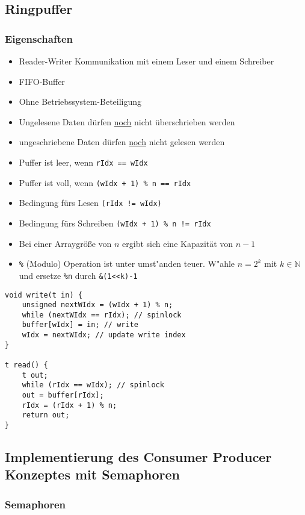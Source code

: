 \subsection{Ringpuffer}

\subsubsection{Eigenschaften}
\begin{itemize}
\item Reader-Writer Kommunikation mit einem Leser und einem Schreiber
\item FIFO-Buffer
\item Ohne Betriebssystem-Beteiligung
\item Ungelesene Daten dürfen \uline{noch} nicht überschrieben werden
\item ungeschriebene Daten dürfen \uline{noch} nicht gelesen werden
\item Puffer ist leer, wenn \texttt{rIdx == wIdx}
\item Puffer ist voll, wenn \verb|(wIdx + 1) % n == rIdx|
\item Bedingung fürs Lesen \texttt{(rIdx != wIdx)}
\item Bedingung fürs Schreiben \verb|(wIdx + 1) % n != rIdx|
\item Bei einer Arraygröße von $n$ ergibt sich eine Kapazität von $n -1$
\item \verb|%| (Modulo) Operation ist unter umst"anden teuer. W"ahle $n=2^k$ mit 
$k \in \mathbb{N}$ und ersetze \verb|%n| durch \verb|&(1<<k)-1|
\end{itemize}

\begin{lstlisting}
void write(t in) {
	unsigned nextWIdx = (wIdx + 1) % n;
	while (nextWIdx == rIdx); // spinlock
	buffer[wIdx] = in; // write
	wIdx = nextWIdx; // update write index
}

t read() {
	t out;
	while (rIdx == wIdx); // spinlock
	out = buffer[rIdx]; 
	rIdx = (rIdx + 1) % n;
	return out;
}
\end{lstlisting}

\subsection{Implementierung des Consumer Producer Konzeptes mit Semaphoren}

\subsubsection{Semaphoren}

